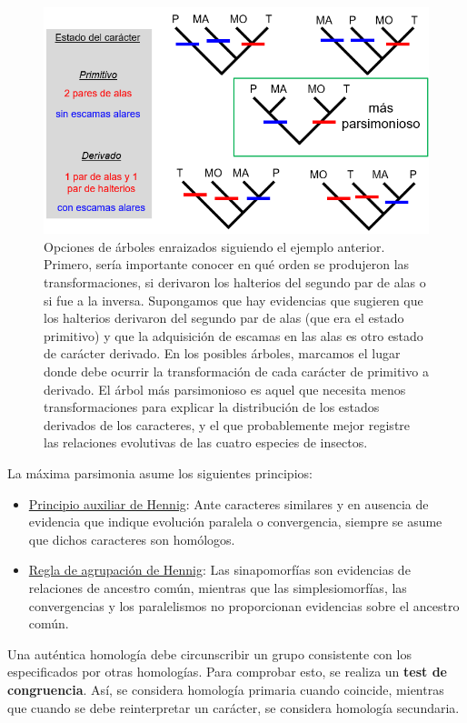 \begin{figure}[htbp]
\centering
\includegraphics[width=0.5\linewidth]{figs/ejemplo-arbol-enraizado.png}
\caption{Opciones de árboles enraizados siguiendo el ejemplo anterior. Primero, sería importante conocer en qué orden se produjeron las transformaciones, si derivaron los halterios del segundo par de alas o si fue a la inversa. Supongamos que hay evidencias que sugieren que los halterios derivaron del segundo par de alas (que era el estado primitivo) y que la adquisición de escamas en las alas es otro estado de carácter derivado. En los posibles árboles, marcamos el lugar donde debe ocurrir la transformación de cada carácter de primitivo a derivado. El árbol más parsimonioso es aquel que necesita menos transformaciones para explicar la distribución de los estados derivados de los caracteres, y el que probablemente mejor registre las relaciones evolutivas de las cuatro especies de insectos.}
\end{figure}

La máxima parsimonia asume los siguientes principios: \begin{itemize}
\item \underline{Principio auxiliar de Hennig}: Ante caracteres similares y en ausencia de evidencia que indique evolución paralela o convergencia, siempre se asume que dichos caracteres son homólogos.
\item \underline{Regla de agrupación de Hennig}: Las sinapomorfías son evidencias de relaciones de ancestro común, mientras que las simplesiomorfías, las convergencias y los paralelismos no proporcionan evidencias sobre el ancestro común. 
\end{itemize}

Una auténtica homología debe circunscribir un grupo consistente con los especificados por otras homologías. Para comprobar esto, se realiza un \textbf{test de congruencia}. Así, se considera homología primaria cuando coincide, mientras que cuando se debe reinterpretar un carácter, se considera homología secundaria.

